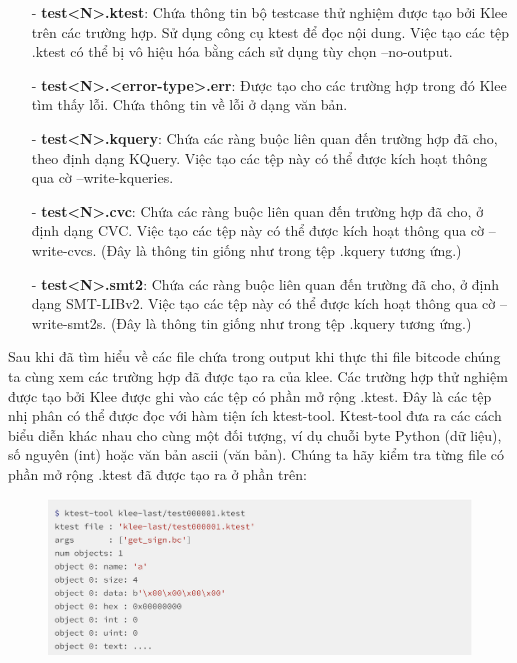 \documentclass[12pt,a4paper]{article}
\begin{document}
\begin{itemize}
\item[-] \textbf{test<N>.ktest}: Chứa thông tin bộ testcase thử nghiệm được tạo bởi Klee trên các trường hợp. Sử dụng công cụ ktest để đọc nội dung. Việc tạo các tệp .ktest có thể bị vô hiệu hóa bằng cách sử dụng tùy chọn --no-output.
\item[-] \textbf{test<N>.<error-type>.err}: Được tạo cho các trường hợp trong đó Klee tìm thấy lỗi. Chứa thông tin về lỗi ở dạng văn bản.
\item[-] \textbf{test<N>.kquery}: Chứa các ràng buộc liên quan đến trường hợp đã cho, theo định dạng KQuery. Việc tạo các tệp này có thể được kích hoạt thông qua cờ --write-kqueries.
\item[-] \textbf{test<N>.cvc}: Chứa các ràng buộc liên quan đến trường hợp đã cho, ở định dạng CVC. Việc tạo các tệp này có thể được kích hoạt thông qua cờ --write-cvcs. (Đây là thông tin giống như trong tệp .kquery tương ứng.)
\item[-] \textbf{test<N>.smt2}: Chứa các ràng buộc liên quan đến trường đã cho, ở định dạng SMT-LIBv2. Việc tạo các tệp này có thể được kích hoạt thông qua cờ --write-smt2s. (Đây là thông tin giống như trong tệp .kquery tương ứng.)
\end{itemize}

Sau khi đã tìm hiểu về các file chứa trong output khi thực thi file bitcode chúng ta cùng xem các trường hợp đã được tạo ra của klee. Các trường hợp thử nghiệm được tạo bởi Klee được ghi vào các tệp có phần mở rộng .ktest. Đây là các tệp nhị phân có thể được đọc với hàm tiện ích ktest-tool. Ktest-tool đưa ra các cách biểu diễn khác nhau cho cùng một đối tượng, ví dụ chuỗi byte Python (dữ liệu), số nguyên (int) hoặc văn bản ascii (văn bản). Chúng ta hãy kiểm tra từng file có phần mở rộng .ktest đã được tạo ra ở phần trên:

\begin{figure}[ht]
\begin{center}
\includegraphics[scale=.3]{hinhanh/test1.png}
\end{center}
\end{figure}
\end{document}
